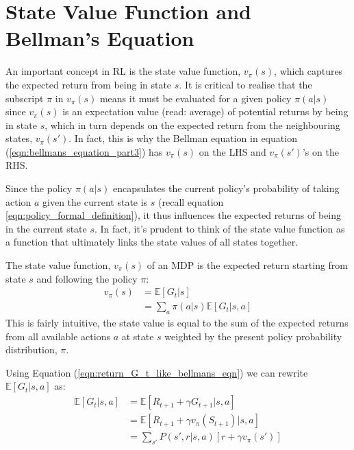 \documentclass[a4paper,11pt]{article}
\begin{document}
\section{State Value Function and Bellman's Equation}

An important concept in RL is the state value function, $v_{\pi}(s)$, which captures the expected return from being in state $s$.  It is critical to realise that the subscript $\pi$ in $v_{\pi}(s)$ means it must be evaluated for a given policy $\pi(a|s)$ since $v_{\pi}(s)$ is an expectation value (read: average) of potential returns by being in state $s$, which in turn depends on the expected return from the neighbouring states, $v_{\pi}(s')$.  In fact, this is why the Bellman equation in equation (\ref{eqn:bellmans_equation_part3}) has $v_{\pi}(s)$ on the LHS and $v_{\pi}(s')$'s on the RHS.

Since the policy $\pi(a|s)$ encapsulates the current policy's probability of taking action $a$ given the current state is $s$ (recall equation \ref{eqn:policy_formal_definition}), it thus influences the expected returns of being in the current state $s$.  In fact, it's prudent to think of the state value function as a function that ultimately links the state values of all states together.

The state value function, $v_{\pi}(s)$ of an MDP is the expected return starting from state $s$ and following the policy $\pi$:
\begin{equation} \label{eqn:bellmans_equation_part1}
\begin{split}
        v_\pi (s) &= \mathbb{E}[G_t|s] \\
        &= \sum_{a} \pi(a|s) \mathbb{E} [G_t|s,a]
\end{split}
\end{equation}
This is fairly intuitive, the state value is equal to the sum of the expected returns from all available actions $a$ at state $s$ weighted by the present policy probability distribution, $\pi$.

Using Equation (\ref{eqn:return_G_t_like_bellmans_eqn}) we can rewrite $\mathbb{E} [G_t|s, a]$ as:
\begin{equation} \label{eqn:bellmans_equation_part2}
\begin{split}
        \mathbb{E} [G_t|s, a] &= \mathbb{E} [R_{t+1} + \gamma G_{t+1}|s, a] \\
        &= \mathbb{E} [R_{t+1} + \gamma v_\pi(S_{t+1})|s, a] \\
        &= \sum_{s'} P(s',r|s,a) [r + \gamma v_{\pi}(s')]
\end{split}
\end{equation}
\end{document}
